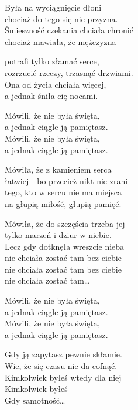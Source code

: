 {}
\begin{text}
    \begin{tinyTwelve}
    \hfill\break
    Była na wyciągnięcie dłoni\\
    chociaż do tego się nie przyzna.\\
    Śmieszność czekania chciała chronić\\
    chociaż mawiała, że mężczyzna

    potrafi tylko złamać serce,\\
    rozrzucić rzeczy, trzasnąć drzwiami.\\
    Ona od życia chciała więcej,\\
    a jednak śniła cię nocami.

    \vin Mówili, że nie była święta,\\
    \vin a jednak ciągle ją pamiętasz.\\
    \vin Mówili, że nie była święta,\\
    \vin a jednak ciągle ją pamiętasz.

    \hfill\break
    Mówiła, że z kamieniem serca\\
    łatwiej - bo przecież nikt nie zrani\\
    tego, kto w sercu nie ma miejsca\\
    na głupią miłość, głupią pamięć.

    Mówiła, że do szczęścia trzeba jej\\
    tylko marzeń i dziur w niebie.\\
    Lecz gdy dotknęła wreszcie nieba\\
    nie chciała zostać tam bez ciebie\\
    nie chciała zostać tam bez ciebie\\
    nie chciała zostać tam…

    \hfill\break
    \vin Mówili, że nie była święta,\\
    \vin a jednak ciągle ją pamiętasz.\\
    \vin Mówili, że nie była święta,\\
    \vin a jednak ciągle ją pamiętasz.

    \hfill\break
    Gdy ją zapytasz pewnie skłamie.\\
    Wie, że się czasu nie da cofnąć.\\
    Kimkolwiek byłeś wtedy dla niej\\
    Kimkolwiek byłeś\\
    Gdy samotność…


\end{tinyTwelve}
\end{text}
